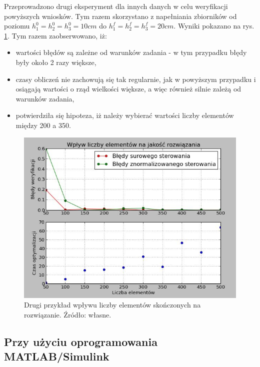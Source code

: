 Przeprowadzono drugi eksperyment dla innych danych w celu weryfikacji powyższych wniosków. Tym razem skorzystano z napełniania zbiorników od poziomu $h_{1}^{0} = h_{2}^{0} = h_{3}^{0} = 10 cm$ do $h_{1}^{f} = h_{2}^{f} = h_{3}^{f} = 20 cm$. Wyniki pokazano na rys. \ref{fig:elementsinfluence10-2050-500}. Tym razem zaobserwowano, iż:
\begin{itemize}
    \item wartości błędów są zależne od warunków zadania - w tym przypadku błędy były około 2 razy większe,
    \item czasy obliczeń nie zachowują się tak regularnie, jak w powyższym przypadku i osiągają wartości o rząd wielkości większe, a więc również silnie zależą od warunków zadania,
    \item potwierdziła się hipoteza, iż należy wybierać wartości liczby elementów między 200 a 350.
\end{itemize}

\begin{figure}[ht]
    \centering
    \includegraphics{Grafika/elements_influence_10-20_50-500}
    \caption{Drugi przykład wpływu liczby elementów skończonych na rozwiązanie. Źródło: własne.}
    \label{fig:elementsinfluence10-2050-500}
\end{figure}


\subsection{Przy użyciu oprogramowania MATLAB/Simulink}
\label{sub:sym-wer-matlab}

